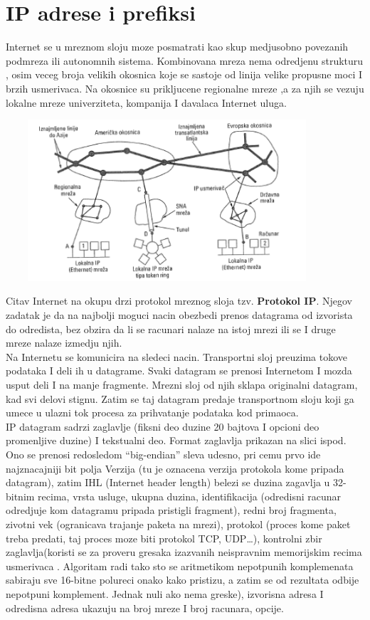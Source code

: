 \documentclass{article} %
\begin{document}
\section{IP adrese i prefiksi}
Internet se u mreznom sloju moze posmatrati kao skup medjusobno povezanih podmreza ili autonomnih sistema. Kombinovana mreza nema odredjenu strukturu , osim veceg broja velikih okosnica koje se sastoje od linija velike propusne moci I brzih usmerivaca. Na okosnice su prikljucene regionalne mreze ,a za njih se vezuju lokalne mreze univerziteta, kompanija I davalaca Internet uluga.\\

\begin{center}
\includegraphics[width=12cm, height=6cm]{okosnica}\\
\end{center}
Citav Internet na okupu drzi protokol mreznog sloja tzv. \textbf{Protokol IP}. Njegov zadatak je da na najbolji moguci nacin obezbedi prenos datagrama od izvorista do odredista, bez obzira da li se racunari nalaze na istoj mrezi ili se I druge mreze nalaze izmedju njih.\\

Na Internetu se komunicira na sledeci nacin. Transportni sloj preuzima tokove podataka I deli ih u datagrame. Svaki datagram se prenosi Internetom I mozda usput deli I na  manje fragmente. Mrezni sloj od njih sklapa originalni datagram, kad svi delovi stignu. Zatim se taj datagram predaje transportnom sloju koji ga umece u ulazni tok procesa za prihvatanje podataka kod primaoca.\\

IP datagram sadrzi zaglavlje (fiksni deo duzine 20 bajtova I opcioni deo promenljive duzine) I tekstualni deo. Format zaglavlja prikazan na slici ispod. Ono se prenosi redosledom  “big-endian” sleva udesno, pri cemu prvo ide najznacajniji bit polja Verzija (tu je oznacena verzija protokola kome pripada datagram), zatim IHL (Internet header length) belezi se duzina zagavlja u 32-bitnim recima, vrsta usluge, ukupna duzina, identifikacija (odredisni racunar odredjuje kom  datagramu pripada pristigli fragment), redni broj fragmenta, zivotni vek (ogranicava trajanje paketa na mrezi), protokol (proces kome paket treba predati, taj proces moze biti protokol TCP, UDP…), kontrolni zbir zaglavlja(koristi se za proveru gresaka izazvanih neispravnim memorijskim recima usmerivaca . Algoritam radi tako sto se aritmetikom nepotpunih komplemenata sabiraju sve 16-bitne polureci onako kako pristizu, a zatim se od rezultata odbije nepotpuni komplement. Jednak nuli ako nema greske), izvorisna adresa I odredisna adresa ukazuju na broj mreze I broj racunara, opcije.
\end{document}
